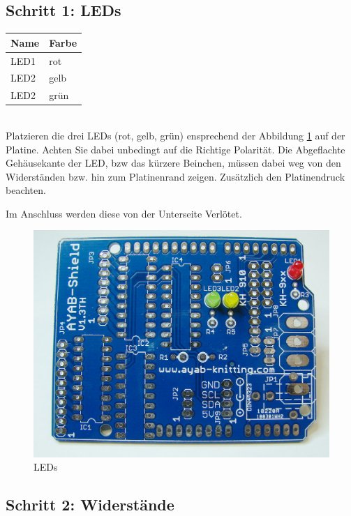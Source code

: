 \documentclass[fleqn,10pt]{SelfArx} %
\begin{document}
 \subsection*{Schritt 1: LEDs}


\begin{tabular}{ll}
\hline
\textbf{Name} & \textbf{Farbe} \\ \hline
LED1          & rot            \\ \hline
LED2          & gelb           \\ \hline
LED2          & grün           \\ \hline
\end{tabular}\\

Platzieren die drei LEDs (rot, gelb, grün) ensprechend der Abbildung \ref{fig:abb1_1} auf der Platine. Achten Sie dabei unbedingt auf die Richtige Polarität. Die Abgeflachte Gehäusekante der LED, bzw das kürzere Beinchen, müssen dabei weg von den Widerständen bzw. hin zum Platinenrand zeigen. Zusätzlich den Platinendruck beachten.

Im Anschluss werden diese von der Unterseite Verlötet.

\begin{figure}[tbhp]\centering
\includegraphics[width=\linewidth]{abb1_1}
\caption{LEDs}
\label{fig:abb1_1}
\end{figure}

\FloatBarrier

 \subsection*{Schritt 2: Widerstände}
\end{document}
